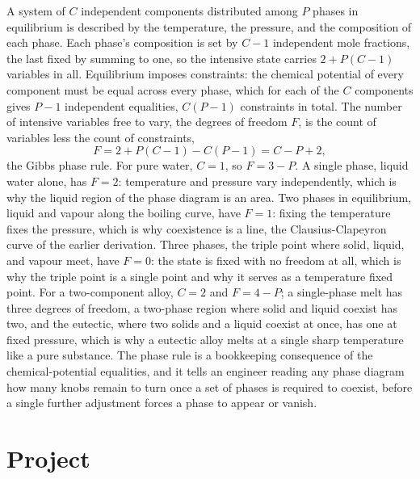 A system of $C$ independent components distributed among $P$ phases in equilibrium
is described by the temperature, the pressure, and the composition of each phase.
Each phase's composition is set by $C - 1$ independent mole fractions, the last
fixed by summing to one, so the intensive state carries $2 + P(C-1)$ variables in
all. Equilibrium imposes constraints: the chemical potential of every component must
be equal across every phase, which for each of the $C$ components gives $P - 1$
independent equalities, $C(P-1)$ constraints in total. The number of intensive
variables free to vary, the degrees of freedom $F$, is the count of variables less
the count of constraints,
\[
F = 2 + P(C-1) - C(P-1) = C - P + 2,
\]
the Gibbs phase rule. For pure water, $C = 1$, so $F = 3 - P$. A single phase, liquid
water alone, has $F = 2$: temperature and pressure vary independently, which is why
the liquid region of the phase diagram is an area. Two phases in equilibrium, liquid
and vapour along the boiling curve, have $F = 1$: fixing the temperature fixes the
pressure, which is why coexistence is a line, the Clausius-Clapeyron curve of the
earlier derivation. Three phases, the triple point where solid, liquid, and vapour
meet, have $F = 0$: the state is fixed with no freedom at all, which is why the
triple point is a single point and why it serves as a temperature fixed point. For a
two-component alloy, $C = 2$ and $F = 4 - P$; a single-phase melt has three degrees
of freedom, a two-phase region where solid and liquid coexist has two, and the
eutectic, where two solids and a liquid coexist at once, has one at fixed pressure,
which is why a eutectic alloy melts at a single sharp temperature like a pure
substance. The phase rule is a bookkeeping consequence of the chemical-potential
equalities, and it tells an engineer reading any phase diagram how many knobs remain
to turn once a set of phases is required to coexist, before a single further
adjustment forces a phase to appear or vanish.





\section{Project}

